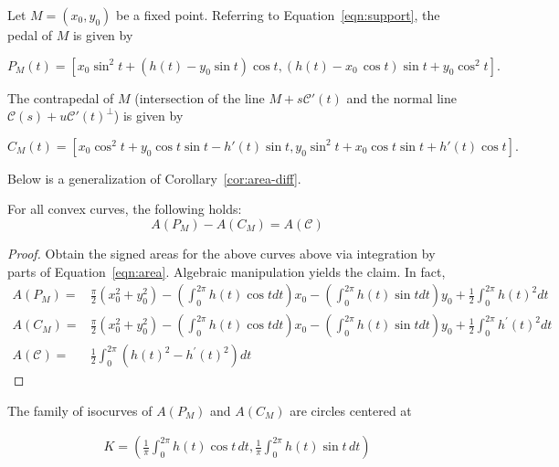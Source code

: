 Let $M=(x_0,y_0)$ be a fixed point. Referring to Equation~\ref{eqn:support}, the pedal of $M$ is given by

\begin{equation}\label{eq:pedal}
 P_M(t)= [  x_0 \sin^2 t + \left( h(t) -y_0\sin
 t    \right) \cos t, \left( h(t) -{  x_0}\,\cos t  
   \right) \sin t +   y_0\cos^2 t ].
\end{equation}


The contrapedal of $M$ (intersection of the line $M+s \mathcal{C}'(t)$ and the normal line $\mathcal{C}(s)+u\mathcal{C}'(t)^{\perp}$) is given by

\begin{equation}\label{eq:contrapedal}
C_M(t)=  [ x_0  \cos^2t   +y_0\cos t
 \sin t -h'(t) \sin t , y_0 \sin^2t
 +x_0\cos t \sin t 
	 + h'(t) \cos t]
.
\end{equation}

Below is a generalization of Corollary~\ref{cor:area-diff}.


\begin{proposition}
For all convex curves, the following holds:
	\[A(P_M)-A(C_M)=A(\mathcal{C})\]
	\label{prop:darea}

\end{proposition}

\begin{proof}
Obtain the signed areas for the above curves above via integration by parts of  Equation~\ref{eqn:area}. Algebraic manipulation yields the claim.
In fact, 
\begin{align*}
A(P_M)=& \frac{\pi}{2}(x_0^2+y_0^2)- \left(\int_0^{2\pi}\!\!\!\!\!\!h(t)\cos t dt\right) x_0- \left(\int_0^{2\pi}\!\!\!\!\!\!h(t)\sin t dt \right) y_0+\frac{1}{2}  \int_0^{2\pi}\!\!\!\!\!\!h(t)^2 dt\\
A(C_M)=& \frac{\pi}{2}(x_0^2+y_0^2)- \left(\int_0^{2\pi}\!\!\!\!\!\!{h(t)\cos{t}dt}\right) x_0- \left(\int_0^{2\pi}\!\!\!\!\!\!h(t)\sin t dt \right) y_0+\frac{1}{2}\int_0^{2\pi}\!\!\!\!\!\!h^\prime(t)^2 dt\\
A(\mathcal{C})=& \frac{1}{2}\int_0^{2\pi}\!\!\!\!\!(h(t)^2-h^{\prime}(t)^2)dt
%
\end{align*}
\end{proof}


\begin{corollary} The family of isocurves of $A(P_M)$ and $A(C_M)$ are circles centered at
	
	\begin{align*}
	\label{eq:centroK}
K=\left(	\frac{1}{\pi} \int_0^{2\pi}\!\!\!\!\! h(t)\cos t \,dt,	\frac{1}{\pi} \int_0^{2\pi}\!\!\!\!\! h(t)\sin t \, dt\right)
	\end{align*}
	
	
\end{corollary}

